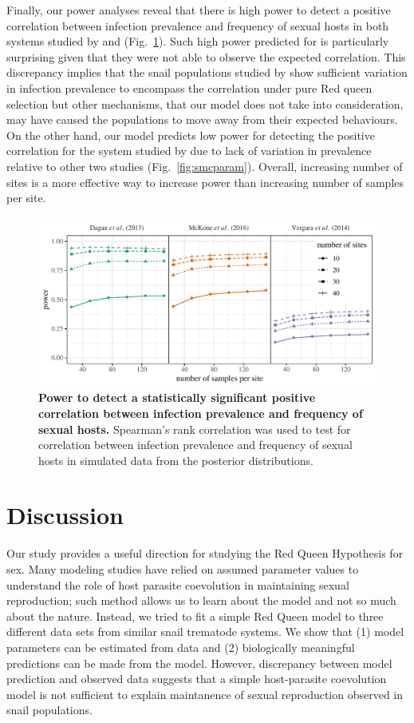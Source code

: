 \documentclass{article}\usepackage[]{graphicx}\usepackage[]{color}
\newcommand{\fref}[1]{Fig.~\ref{fig:#1}}
\begin{document}
Finally, our power analyses reveal that there is high power to detect a positive correlation between infection prevalence and frequency of sexual hosts in both systems studied by \cite{dagan2013clonal} and \cite{mckone2016fine} (\fref{power}).
Such high power predicted for \cite{dagan2013clonal} is particularly surprising given that they were not able to observe the expected correlation.
This discrepancy implies that the snail populations studied by \cite{dagan2013clonal} show sufficient variation in infection prevalence to encompass the correlation under pure Red queen selection but other mechanisms, that our model does not take into consideration, may have caused the populations to move away from their expected behaviours.
On the other hand, our model predicts low power for detecting the positive correlation for the system studied by \cite{vergara2014infection} due to lack of variation in prevalence relative to other two studies (\fref{smcparam}).
Overall, increasing number of sites is a more effective way to increase power than increasing number of samples per site.

\begin{figure}[!ht]
\includegraphics[width=\textwidth]{../fig/power.pdf}
\caption{{\bf Power to detect a statistically significant positive correlation between infection prevalence and frequency of sexual hosts.}
Spearman's rank correlation was used to test for correlation between infection prevalence and frequency of sexual hosts in simulated data from the posterior distributions.
}
\label{fig:power}
\end{figure}

\section{Discussion}

Our study provides a useful direction for studying the Red Queen Hypothesis for sex.
Many modeling studies have relied on assumed parameter values to understand the role of host parasite coevolution in maintaining sexual reproduction; 
such method allows us to learn about the model and not so much about the nature.
Instead, we tried to fit a simple Red Queen model to three different data sets from similar snail trematode systems.
We show that (1) model parameters can be estimated from data and (2) biologically meaningful predictions can be made from the model.
However, discrepancy between model prediction and observed data suggests that a simple host-parasite coevolution model is not sufficient to explain maintanence of sexual reproduction observed in snail populations.
\end{document}
